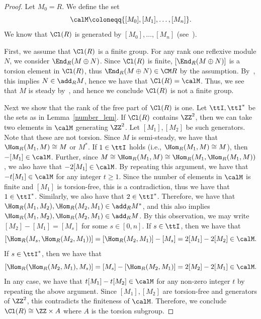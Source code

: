 \begin{proof}
Let $M_0=R$. We define the set
\[
\calM\coloneqq\{  [M_0], [M_1],\dots, [M_n] \}.
\]
We know that $\Cl(R)$ is generated by $[M_0],\dots,[M_n]$ (see~\cite[Proposition~2.8$\MK$(a)]{IN}).

First, we assume that $\Cl(R)$ is a finite group. For any rank one reflexive module $N$, we consider $\End_R(M\oplus N)$. Since $\Cl(R)$ is finite, $[\End_R(M\oplus N)]$ is a torsion element in $\Cl(R)$, thus $\End_R(M\oplus N)\in\CM R$ by the assumption. By~\cite[Proposition~4.5]{IW2}, this implies $N\in\add_RM$, hence we have that $\Cl(R)=\calM$. Thus, we see that $M$ is steady by~\cite[Theorem~3.1]{IN}, and hence we conclude $\Cl(R)$ is not a finite group.

Next we show that the rank of the free part of $\Cl(R)$ is one. Let $\ttI, \ttI^*$ be the sets as in Lemma~\ref{number_lem}. If $\Cl(R)$ contains $\ZZ^2$, then we can take two elements in $\calM$ generating $\ZZ^2$. Let $[M_1], [M_2]$ be such generators. Note that these are not torsion. Since $M$ is semi-steady, we have that $\Hom_R(M_1,M)\cong M$ or $M^*$. If $1\in\ttI$ holds (i.e., $\Hom_R(M_1,M)\cong M$), then $-[M_1]\in\calM$. Further, since $M\cong\Hom_R(M_1,M)\cong\Hom_R(M_1,\Hom_R(M_1,M))$, we also have that $-2[M_1]\in\calM$. By repeating this argument, we have that $-t[M_1]\in\calM$ for any integer $t\ge 1$. Since the number of elements in $\calM$ is finite and $[M_1]$ is torsion-free, this is a contradiction, thus we have that $1\in\ttI^*$. Similarly, we also have that $2\in\ttI^*$. Therefore, we have that $\Hom_R(M_1,M_2), \Hom_R(M_2,M_1)\in\add_RM^*$, and this also implies $\Hom_R(M_1,M_2), \Hom_R(M_2,M_1)\in\add_RM$. By this observation, we may write $[M_2]-[M_1]=[M_s]$ for some $s\in[0,n]$. If $s\in\ttI$, then we have that
\[
[\Hom_R(M_s,\Hom_R(M_2,M_1))]=[\Hom_R(M_2,M_1)]-[M_s]=2[M_1]-2[M_2]\in\calM.
\]
If $s\in\ttI^*$, then we have that
\[
[\Hom_R(\Hom_R(M_2,M_1),M_s)]=[M_s]-[\Hom_R(M_2,M_1)]=2[M_2]-2[M_1]\in\calM.
\]
In any case, we have that $t[M_1]-t[M_2]\in\calM$ for any non-zero integer $t$ by repeating the above argument. Since $[M_1], [M_2]$ are torsion-free and generators of $\ZZ^2$, this contradicts the finiteness of $\calM$. Therefore, we conclude $\Cl(R)\cong\ZZ\times A$ where $A$ is the torsion subgroup.


\end{proof}
